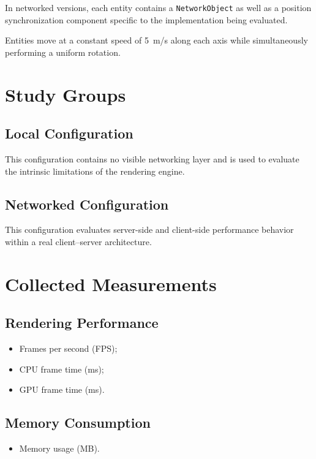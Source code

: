 \documentclass[11pt,a4paper]{article}
\begin{document}
In networked versions, each entity contains a \texttt{NetworkObject} as well as a position synchronization component specific to the implementation being evaluated.

Entities move at a constant speed of 5~m/s along each axis while simultaneously performing a uniform rotation.

\section{Study Groups}

\subsection{Local Configuration}

This configuration contains no visible networking layer and is used to evaluate the intrinsic limitations of the rendering engine.

\subsection{Networked Configuration}

This configuration evaluates server-side and client-side performance behavior within a real client--server architecture.

\section{Collected Measurements}

\subsection{Rendering Performance}

\begin{itemize}
\item Frames per second (FPS);
\item CPU frame time (ms);
\item GPU frame time (ms).
\end{itemize}

\subsection{Memory Consumption}

\begin{itemize}
\item Memory usage (MB).
\end{itemize}
\end{document}
